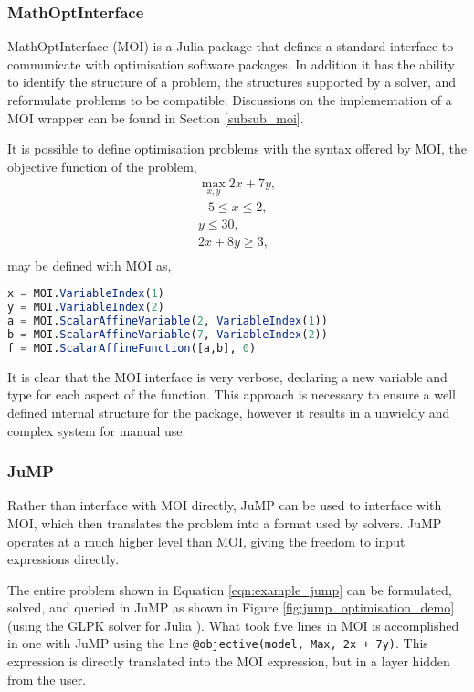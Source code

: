 \subsubsection{MathOptInterface}
MathOptInterface (MOI) is a Julia package that defines a standard interface to communicate with optimisation software packages. In addition it has the ability to identify the structure of a problem, the structures supported by a solver, and reformulate problems to be compatible. Discussions on the implementation of a MOI wrapper can be found in Section \ref{subsub_moi}.

It is possible to define optimisation problems with the syntax offered by MOI, the objective function of the problem,
\begin{equation}
\begin{aligned}
    \max_{x,y} 2x+7y, \\
    -5 \leq x \leq 2, \\
    y \leq 30, \\
    2x + 8y \geq 3, \\
    \label{eqn:example_jump}
\end{aligned}
\end{equation}
may be defined with MOI as,
\begin{lstlisting}[language=julia]
x = MOI.VariableIndex(1)
y = MOI.VariableIndex(2)
a = MOI.ScalarAffineVariable(2, VariableIndex(1))
b = MOI.ScalarAffineVariable(7, VariableIndex(2))
f = MOI.ScalarAffineFunction([a,b], 0)
\end{lstlisting}
It is clear that the MOI interface is very verbose, declaring a new variable and type for each aspect of the function. This approach is necessary to ensure a well defined internal structure for the package, however it results in a unwieldy and complex system for manual use.

\subsubsection{JuMP}
Rather than interface with MOI directly, JuMP can be used to interface with MOI, which then translates the problem into a format used by solvers. JuMP operates at a much higher level than MOI, giving the freedom to input expressions directly. 

The entire problem shown in Equation \ref{eqn:example_jump} can be formulated, solved, and queried in JuMP as shown in Figure \ref{fig:jump_optimisation_demo} (using the GLPK solver for Julia \cite{JuliaOpt/GLPK.jl:Julia}). What took five lines in MOI is accomplished in one with JuMP using the line \lstinline{@objective(model, Max, 2x + 7y)}. This expression is directly translated into the MOI expression, but in a layer hidden from the user. 

